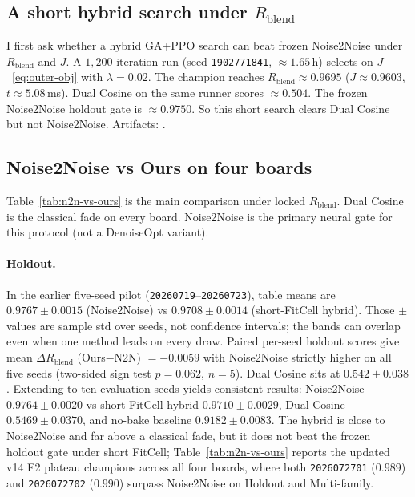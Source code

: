 \subsection{A short hybrid search under $R_{\mathrm{blend}}$}
\label{sec:v10-freeze}

I first ask whether a hybrid GA+PPO search can beat frozen Noise2Noise under $R_{\mathrm{blend}}$ and $J$.
A $1{,}200$-iteration run (seed \texttt{1902771841}, ${\approx}1.65$\,h) selects on $J$~\eqref{eq:outer-obj} with $\lambda{=}0.02$.
The champion reaches $R_{\mathrm{blend}}{\approx}0.9695$ ($J{\approx}0.9603$, $t{\approx}5.08$\,ms).
Dual Cosine on the same runner scores ${\approx}0.504$.
The frozen Noise2Noise holdout gate is ${\approx}0.9750$.
So this short search clears Dual Cosine but not Noise2Noise.
Artifacts:
.

\subsection{Noise2Noise vs Ours on four boards}
\label{sec:n2n-vs-ours-boards}

Table~\ref{tab:n2n-vs-ours} is the main comparison under locked $R_{\mathrm{blend}}$.
Dual Cosine is the classical fade on every board.
Noise2Noise is the primary neural gate for this protocol (not a DenoiseOpt variant).

\paragraph{Holdout.}
In the earlier five-seed pilot (\texttt{20260719}--\texttt{20260723}), table means are
$0.9767{\pm}0.0015$ (Noise2Noise) vs $0.9708{\pm}0.0014$ (short-FitCell hybrid).
Those $\pm$ values are sample std over seeds, not confidence intervals; the bands can overlap even when one method leads on every draw.
Paired per-seed holdout scores give mean $\Delta R_{\mathrm{blend}}$ (Ours$-$N2N) $={-}0.0059$ with Noise2Noise strictly higher on all five seeds (two-sided sign test $p{=}0.062$, $n{=}5$).
Dual Cosine sits at $0.542{\pm}0.038$.
Extending to ten evaluation seeds yields consistent results: Noise2Noise $0.9764{\pm}0.0020$ vs short-FitCell hybrid $0.9710{\pm}0.0029$, Dual Cosine $0.5469{\pm}0.0370$, and no-bake baseline $0.9182{\pm}0.0083$.
The hybrid is close to Noise2Noise and far above a classical fade, but it does not beat the frozen holdout gate under short FitCell; Table~\ref{tab:n2n-vs-ours} reports the updated v14 E2 plateau champions across all four boards, where both \texttt{2026072701} ($0.989$) and \texttt{2026072702} ($0.990$) surpass Noise2Noise on Holdout and Multi-family.


